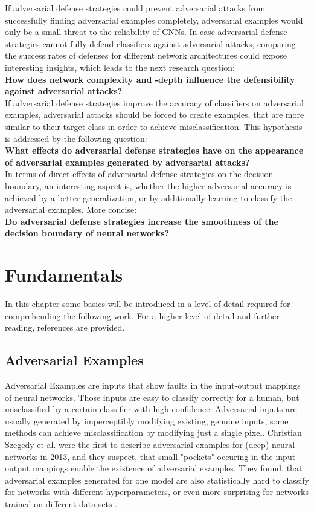 \documentclass[draft,final]{vutinfth} %
\begin{document}
If adversarial defense strategies could prevent adversarial attacks from successfully finding adversarial examples completely, adversarial examples would only be a small threat to the reliability of CNNs.
In case adversarial defense strategies cannot fully defend classifiers against adversarial attacks, comparing the success rates of defenses for different network architectures could expose
interesting insights, which leads to the next research question:\\
\textbf{How does network complexity and -depth influence the defensibility against adversarial attacks?} \\
If adversarial defense strategies improve the accuracy of classifiers on adversarial examples, adversarial attacks should be forced to create examples, that are more similar to their target
class in order to achieve misclassification.
This hypothesis is addressed by the following question: \\
\textbf{What effects do adversarial defense strategies have on the appearance of adversarial examples generated by adversarial attacks?} \\
In terms of direct effects of adversarial defense strategies on the decision boundary, an interesting aspect is, whether the higher adversarial accuracy is achieved by a better generalization, or by additionally learning to classify the adversarial examples.
More concise:\\
\textbf{Do adversarial defense strategies increase the smoothness of the decision boundary of neural networks?}

\chapter{Fundamentals}

In this chapter some basics will be introduced in a level of detail required for comprehending the following work.
For a higher level of detail and further reading, references are provided.

\section{Adversarial Examples}

Adversarial Examples are inputs that show faults in the input-output mappings of neural networks.
Those inputs are easy to classify correctly for a human, but misclassified by a certain classifier with high confidence.
Adversarial inputs are usually generated by imperceptibly modifying existing, genuine inputs, some methods can achieve misclassification by modifying just a single pixel\cite{Jiawei2017}.
Christian Szegedy et al. were the first to describe adversarial examples for (deep) neural networks in 2013, and they suspect, that small "pockets" occuring in the input-output mappings enable the existence of adversarial examples.
They found, that adversarial examples generated for one model are also statistically hard to classify for networks with different hyperparameters, or even more surprising for networks trained on different data sets \cite{Szegedy2013}.
\end{document}
